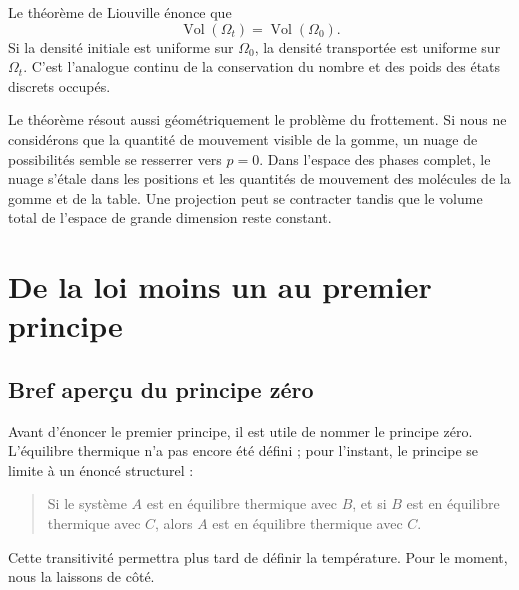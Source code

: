 Le théorème de Liouville énonce que
\begin{equation}
 \operatorname{Vol}(\Omega_t)
 =
 \operatorname{Vol}(\Omega_0).
 \label{eq:sm1-liouville-volume}
\end{equation}
Si la densité initiale est uniforme sur \(\Omega_0\), la densité transportée est uniforme sur \(\Omega_t\). C’est l’analogue continu de la conservation du nombre et des poids des états discrets occupés.

Le théorème résout aussi géométriquement le problème du frottement. Si nous ne considérons que la quantité de mouvement visible de la gomme, un nuage de possibilités semble se resserrer vers \(p=0\). Dans l’espace des phases complet, le nuage s’étale dans les positions et les quantités de mouvement des molécules de la gomme et de la table. Une projection peut se contracter tandis que le volume total de l’espace de grande dimension reste constant.

\begin{classroomqa}
\end{classroomqa}

\section{De la loi moins un au premier principe}

\subsection{Bref aperçu du principe zéro}

Avant d’énoncer le premier principe, il est utile de nommer le principe zéro. L’équilibre thermique n’a pas encore été défini ; pour l’instant, le principe se limite à un énoncé structurel :
\begin{quote}
Si le système \(A\) est en équilibre thermique avec \(B\), et si \(B\) est en équilibre thermique avec \(C\), alors \(A\) est en équilibre thermique avec \(C\).
\end{quote}
Cette transitivité permettra plus tard de définir la température. Pour le moment, nous la laissons de côté.

